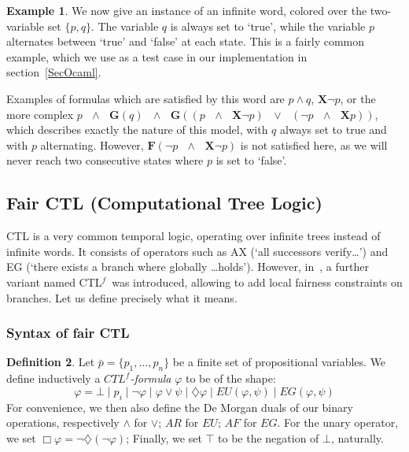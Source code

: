 \documentclass[11pt]{article}
\newcommand{\CTLf}{{CTL$^f$}}
\newcommand{\X}{{\mathbf{X}}}
\newcommand{\F}{{\mathbf{F}}}
\newcommand{\orr}{{\vee}}
\newcommand{\andd}{{\wedge}}
\newcommand{\phii}{{\varphi}}
\newcommand{\G}{{\mathbf{G}}}
\newcommand{\dia}{{\diamondsuit}}
\theoremstyle{definition}
\newtheorem{definition}{Definition}
\newtheorem{example}[definition]{Example}
\begin{document}
\begin{example}\label{inf_word_ex}
We now give an instance of an infinite word, colored over the two-variable set $\{p,q\}$. The variable $q$ is always set to `true',
while the variable $p$ alternates between `true' and `false' at each state. This is a fairly common example, which we use as a test 
case in our implementation in section~\ref*{SecOcaml}.

\begin{center} 
\end{center}

Examples of formulas which are satisfied by this word are $p\andd q$, $\X\neg p$, or the more complex 
$p\mbox{ }\andd \mbox{ }\G(q)\mbox{ }\andd \mbox{ }\G((p \mbox{ }\andd\mbox{ } \X\neg p)\mbox{ } \orr \mbox{ }(\neg p \mbox{ }\andd\mbox{ } \X p))$, which describes exactly the nature of this model,
with $q$ always set to true and with $p$ alternating.
However, $\F(\neg p \mbox{ } \andd \mbox{ }\X\neg p)$ is not satisfied here, as we will never reach two consecutive states where 
$p$ is set to `false'.

\end{example}

\subsection{Fair CTL (Computational Tree Logic)}
CTL is a very common temporal logic, operating over infinite trees instead of infinite words.
It consists of operators such as AX (`all successors verify\ldots') and EG
(`there exists a branch where globally \ldots holds'). However, in~\cite{GhivG16}, a 
further variant named
\CTLf~was introduced, allowing to add local fairness constraints on branches. Let us define precisely
what it means.

\subsubsection*{Syntax of fair CTL}\label{subsec:syntax_CTLf}

\begin{definition}\label{CTLf_formulas}
    Let $\bar{p}= \{p_1,\ldots,p_n \}$ be a finite set of propositional variables. We define inductively 
    a \emph{$CTL^{f}$-formula} $\varphi$ to be of the shape:
        \[\phii=\bot\mid p_i\mid \neg \varphi\mid\varphi \vee \psi\mid\dia \varphi\mid EU(\varphi,\psi)\mid EG(\varphi,\psi)\]
        For convenience, we then also define the De Morgan duals of our binary operations, respectively $\wedge$ for $\vee$; $AR$ for $EU$; $AF$ for $EG$. For the unary operator, we set $\Box \varphi = \neg \dia(\neg \varphi)$; Finally, we set $\top$ to be the negation of $\bot$, naturally.
\end{definition}
\end{document}
